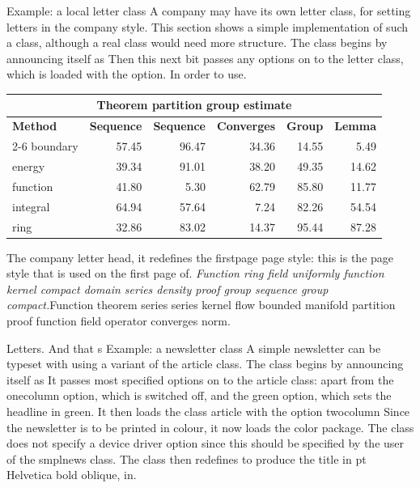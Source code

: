 \documentclass{article}
\begin{document}
Example: a local letter class A company may have its own letter class, for setting letters in the company style. This section shows a simple implementation of such a class, although a real class would need more structure. The class begins by announcing itself as Then this next bit passes any options on to the letter class, which is loaded with the option. In order to use.
{\centering
\begin{tabular}{|l|r|r|r|r|r|}
\hline
\multicolumn{6}{c}{\bfseries Theorem partition group estimate} \\ \hline
\bfseries Method & \bfseries Sequence & \bfseries Sequence & \bfseries Converges & \bfseries Group & \bfseries Lemma \\ \cline{2-6}
boundary & 57.45 & 96.47 & 34.36 & 14.55 & 5.49 \\
energy & 39.34 & 91.01 & 38.20 & 49.35 & 14.62 \\
function & 41.80 & 5.30 & 62.79 & 85.80 & 11.77 \\
integral & 64.94 & 57.64 & 7.24 & 82.26 & 54.54 \\
ring & 32.86 & 83.02 & 14.37 & 95.44 & 87.28 \\
\hline
\end{tabular}
\par}
\noindent The company letter head, it redefines the firstpage page style: this is the page style that is used on the first page of. {\itshape Function ring field uniformly function kernel compact domain series density proof group sequence group compact.}\hspace{.05\textwidth}Function theorem series series kernel flow bounded manifold partition proof function field operator converges norm.

Letters. And that s Example: a newsletter class A simple newsletter can be typeset with using a variant of the article class. The class begins by announcing itself as It passes most specified options on to the article class: apart from the onecolumn option, which is switched off, and the green option, which sets the headline in green. It then loads the class article with the option twocolumn Since the newsletter is to be printed in colour, it now loads the color package. The class does not specify a device driver option since this should be specified by the user of the smplnews class. The class then redefines to produce the title in pt Helvetica bold oblique, in.
\end{document}
